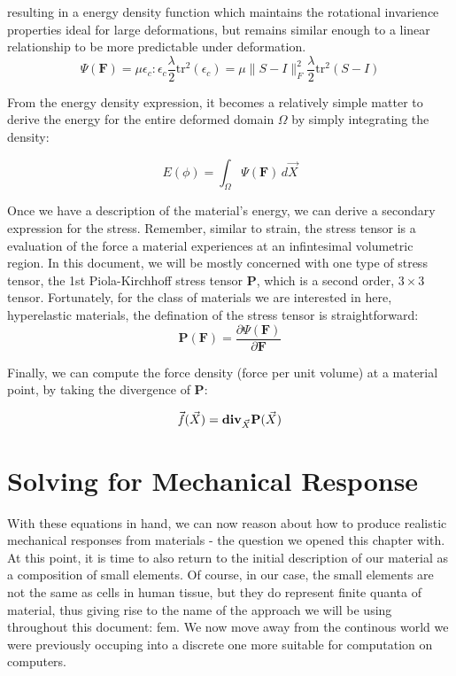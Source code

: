 \documentclass[12pt,oneside,letterpaper]{memoir}
\begin{document}
resulting in a energy density function which maintains the rotational
invarience properties ideal for large deformations, but remains
similar enough to a linear relationship to be more predictable under deformation. 
\begin{equation}
  \label{equ:corotatedelasticity}
   \Psi(\mathbf{F}) = \mu \epsilon_c : \epsilon_c \frac \lambda 2
   \text{tr}^2(\epsilon_c) = \mu \lVert S - I \rVert^2_F \frac \lambda 2
   \text{tr}^2(S-I)
\end{equation}

From the energy density expression, it becomes a relatively simple
matter to derive the energy for the entire deformed domain $\Omega$ by simply
integrating the density:

\begin{equation}
  \label{equ:systemenergy}
  E(\phi) = \int_\Omega \Psi( \mathbf F ) \,d\vec{X}
\end{equation}

Once we have a description of the material's energy, we can derive a
secondary expression for the stress. Remember, similar to strain, the
stress tensor is a evaluation of the force a material experiences at
an infintesimal volumetric region. In this document, we will be mostly
concerned with one type of stress tensor, the 1st Piola-Kirchhoff
stress tensor $\mathbf{P}$, which is a second order, $3 \times 3$
tensor. Fortunately, for the class of materials we are interested in
here, hyperelastic materials, the defination of the stress tensor is
straightforward:
\begin{equation}
  \label{equ:piolakirchhoffstresstensor}
  \mathbf{P}(\mathbf F) = \frac{ \partial \Psi(\mathbf F)}{\partial
    \mathbf F}
\end{equation}

Finally, we can compute the force density (force per unit volume) at a
material point, by taking the divergence of $\mathbf P$:

\begin{equation}
  \label{equ:forcedensity}
  \vec{\mathit f}(\vec X) =
  \text{\textbf{div}}_{\vec X}\mathbf P (\vec X)
\end{equation}

\section{Solving for Mechanical Response}

With these equations in hand, we can now reason about how to produce
realistic mechanical responses from materials - the question we opened
this chapter with. At this point, it is time to also return to the
initial description of our material as a composition of small
elements. Of course, in our case, the small elements are not the same
as cells in human tissue, but they do represent finite quanta of
material, thus giving rise to the name of the approach we will be
using throughout this document: \gls{fem}. We now move away from the
continous world we were previously occuping into a discrete one more
suitable for computation on computers.
\end{document}
